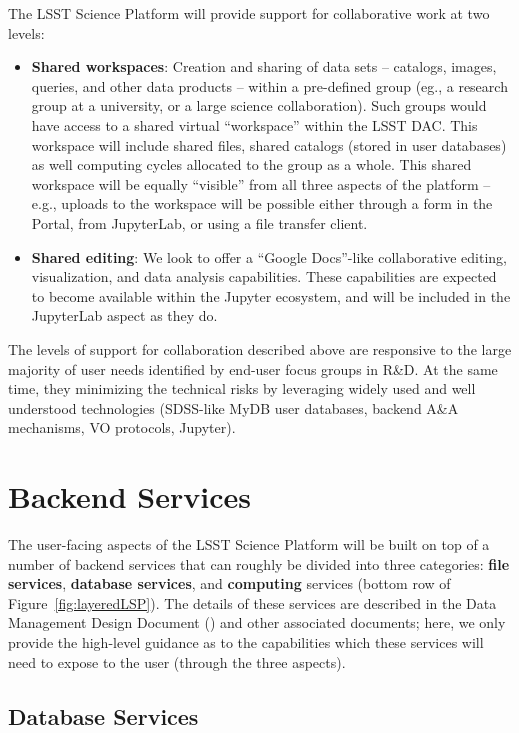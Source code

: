 \documentclass[DM,lsstdraft,toc]{lsstdoc}
\begin{document}
The LSST Science Platform will provide support for collaborative work at two levels:
\begin{itemize}
	\item {\bf Shared workspaces}: Creation and sharing of data sets -- catalogs, images, queries, and other data products -- within a pre-defined group (eg., a research group at a university, or a large science collaboration). Such groups would have access to a shared virtual ``workspace'' within the LSST DAC. This workspace will include shared files, shared catalogs (stored in user databases) as well computing cycles allocated to the group as a whole. This shared workspace will be equally ``visible'' from all three aspects of the platform -- e.g., uploads to the workspace will be possible either through a form in the Portal, from JupyterLab, or using a file transfer client.
	
	\item {\bf Shared editing}: We look to offer a ``Google Docs''-like collaborative editing, visualization, and data analysis capabilities. These capabilities are expected to become available within the Jupyter ecosystem, and will be included in the JupyterLab aspect as they do.
\end{itemize}

The levels of support for collaboration described above are responsive to the large majority of user needs identified by end-user focus groups in R\&D. At the same time, they minimizing the technical risks by leveraging widely used and well understood technologies (SDSS-like MyDB user databases, backend A\&A mechanisms, VO protocols, Jupyter).

\section{Backend Services\label{sec:backend}}

The user-facing aspects of the LSST Science Platform will be built on top of a number of backend services that can roughly be divided into three categories: {\bf file services}, {\bf database services}, and {\bf computing} services (bottom row of Figure~\ref{fig:layeredLSP}). The details of these services are described in the Data Management Design Document () and other associated documents; here, we only provide the high-level guidance as to the capabilities which these services will need to expose to the user (through the three aspects).

\subsection{Database Services}
\end{document}
